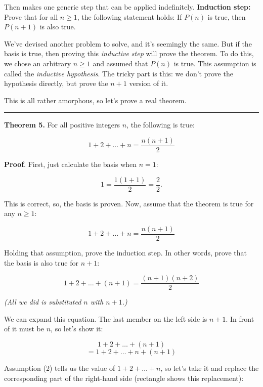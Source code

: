 \documentclass[a4paper, justified, notitlepage, sfsidenotes, notoc]{tufte-book}
\begin{document}
Then makes one generic step that can be applied indefinitely. \textbf{Induction step:} Prove that for all \(n\geq1\), the following statement holds: If \(P(n)\) is true, then \(P(n+1)\) is also true.

We've devised another problem to solve, and it's seemingly the same. But if the basis is true, then proving this \emph{inductive step} will prove the theorem. To do this, we chose an arbitrary \(n\geq1\) and assumed that \(P(n)\) is true. This assumption is called the \emph{inductive hypothesis}. The tricky part is this: we don't prove the hypothesis directly, but prove the \(n+1\) version of it.

This is all rather amorphous, so let's prove a real theorem.

\noindent\rule{\textwidth}{0.5pt}

\textbf{Theorem 5.} For all positive integers \(n\), the following is true:

\begin{equation}
1 + 2 + \ldots + n = \frac{n(n+1)}{2}
\end{equation}

\textbf{Proof}. First, just calculate the basis when \(n = 1\):

$$ 1 = \frac{1(1+1)}{2} = \frac{2}{2}. $$

This is correct, so, the basis is proven. Now, assume that the theorem is true for any \(n\geq1\):

\begin{equation}
1 + 2 + \ldots + n = \frac{n(n+1)}{2}
\end{equation}

Holding that assumption, prove the induction step. In other words, prove that the basis is also true for \(n+1\):

\begin{equation}
1 + 2 + \ldots + (n+1) = \frac{(n+1)(n+2)}{2}
\end{equation}

\emph{(All we did is substituted \(n\) with \(n+1\).)}

We can expand this equation. The last member on the left side is \(n+1\). In front of it must be \(n\), so let's show it:

$$ 1 + 2 + \ldots + (n+1) $$
$$ = 1 + 2 + \ldots + n + (n+1)$$

Assumption (2) tells us the value of \(1 + 2 + \ldots + n\), so let's take it and replace the corresponding part of the right-hand side (rectangle shows this replacement):
\end{document}
